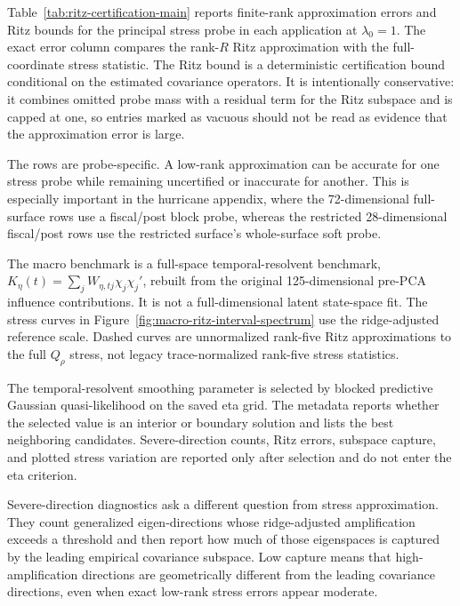 Table~\ref{tab:ritz-certification-main} reports finite-rank approximation errors and Ritz bounds for the principal stress probe in each application at $\lambda_0=1$. The exact error column compares the rank-$R$ Ritz approximation with the full-coordinate stress statistic. The Ritz bound is a deterministic certification bound conditional on the estimated covariance operators. It is intentionally conservative: it combines omitted probe mass with a residual term for the Ritz subspace and is capped at one, so entries marked as vacuous should not be read as evidence that the approximation error is large.

The rows are probe-specific. A low-rank approximation can be accurate for one stress probe while remaining uncertified or inaccurate for another. This is especially important in the hurricane appendix, where the 72-dimensional full-surface rows use a fiscal/post block probe, whereas the restricted 28-dimensional fiscal/post rows use the restricted surface's whole-surface soft probe.

The macro benchmark is a full-space temporal-resolvent benchmark, $K_\eta(t)=\sum_j W_{\eta,tj}\chi_j\chi_j'$, rebuilt from the original 125-dimensional pre-PCA influence contributions. It is not a full-dimensional latent state-space fit. The stress curves in Figure~\ref{fig:macro-ritz-interval-spectrum} use the ridge-adjusted reference scale. Dashed curves are unnormalized rank-five Ritz approximations to the full $Q_\rho$ stress, not legacy trace-normalized rank-five stress statistics.

The temporal-resolvent smoothing parameter is selected by blocked predictive Gaussian quasi-likelihood on the saved eta grid. The metadata reports whether the selected value is an interior or boundary solution and lists the best neighboring candidates. Severe-direction counts, Ritz errors, subspace capture, and plotted stress variation are reported only after selection and do not enter the eta criterion.

Severe-direction diagnostics ask a different question from stress approximation. They count generalized eigen-directions whose ridge-adjusted amplification exceeds a threshold and then report how much of those eigenspaces is captured by the leading empirical covariance subspace. Low capture means that high-amplification directions are geometrically different from the leading covariance directions, even when exact low-rank stress errors appear moderate.



